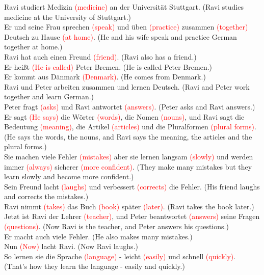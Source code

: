 \documentclass{article}
\begin{document}
Ravi studiert Medizin \textcolor{red}{(medicine)} an der Universität Stuttgart. (Ravi studies medicine at the University of Stuttgart.)\\
Er und seine Frau sprechen \textcolor{red}{(speak)} und üben \textcolor{red}{(practice)} zusammen \textcolor{red}{(together)} Deutsch zu Hause \textcolor{red}{(at home)}. (He and his wife speak and practice German together at home.)\\
Ravi hat auch einen Freund \textcolor{red}{(friend)}. (Ravi also has a friend.)\\
Er heißt \textcolor{red}{(He is called)} Peter Bremen. (He is called Peter Bremen.)\\
Er kommt aus Dänmark \textcolor{red}{(Denmark)}. (He comes from Denmark.)\\
Ravi und Peter arbeiten zusammen und lernen Deutsch. (Ravi and Peter work together and learn German.)\\
Peter fragt \textcolor{red}{(asks)} und Ravi antwortet \textcolor{red}{(answers)}. (Peter asks and Ravi answers.)\\
Er sagt \textcolor{red}{(He says)} die Wörter \textcolor{red}{(words)}, die Nomen \textcolor{red}{(nouns)}, und Ravi sagt die Bedeutung \textcolor{red}{(meaning)}, die Artikel \textcolor{red}{(articles)} und die Pluralformen \textcolor{red}{(plural forms)}. (He says the words, the nouns, and Ravi says the meaning, the articles and the plural forms.)\\
Sie machen viele Fehler \textcolor{red}{(mistakes)} aber sie lernen langsam \textcolor{red}{(slowly)} und werden immer \textcolor{red}{(always)} sicherer \textcolor{red}{(more confident)}. (They make many mistakes but they learn slowly and become more confident.)\\
Sein Freund lacht \textcolor{red}{(laughs)} und verbessert \textcolor{red}{(corrects)} die Fehler. (His friend laughs and corrects the mistakes.)\\
Ravi nimmt \textcolor{red}{(takes)} das Buch \textcolor{red}{(book)} später \textcolor{red}{(later)}. (Ravi takes the book later.)\\
Jetzt ist Ravi der Lehrer \textcolor{red}{(teacher)}, und Peter beantwortet \textcolor{red}{(answers)} seine Fragen \textcolor{red}{(questions)}. (Now Ravi is the teacher, and Peter answers his questions.)\\
Er macht auch viele Fehler. (He also makes many mistakes.)\\
Nun \textcolor{red}{(Now)} lacht Ravi. (Now Ravi laughs.)\\
So lernen sie die Sprache \textcolor{red}{(language)} - leicht \textcolor{red}{(easily)} und schnell \textcolor{red}{(quickly)}. (That's how they learn the language - easily and quickly.)
\end{document}
